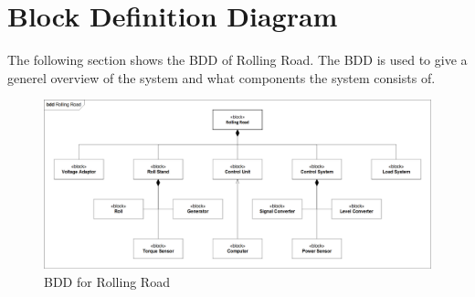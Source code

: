 \section{Block Definition Diagram}
The following section shows the BDD of Rolling Road. The BDD is used to give a generel overview of the system and what components the system consists of. 

\begin{figure}[H]
	\centering
	\includegraphics[width=1\linewidth]{Architecture/Diagrams/BDD_RR}
	\caption{BDD for Rolling Road}
	\label{fig:RR_BDD}
\end{figure}